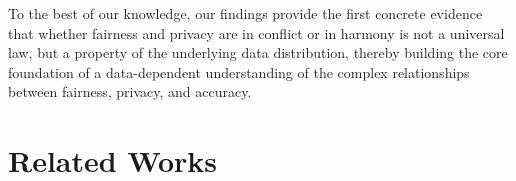 \documentclass[11pt,letterpaper]{article}
\begin{document}

\vspace{-2mm}
To the best of our knowledge, our findings provide the first concrete evidence that whether fairness and privacy are in conflict or in harmony is not a universal law, but a property of the underlying data distribution, 
thereby building the core foundation of a data-dependent understanding of the complex relationships between fairness, privacy, and accuracy.








\section{Related Works} \label{sec:related} 
\end{document}
